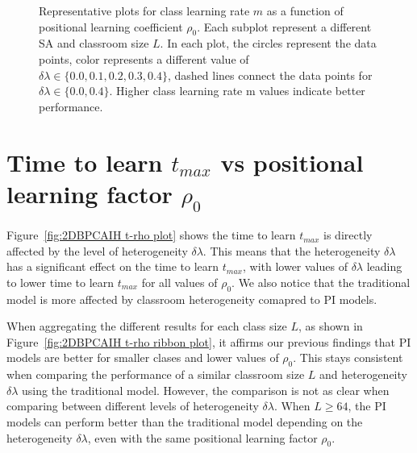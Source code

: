 \begin{figure}[htbp!]
   \caption{Representative plots for class learning rate $m$ as a function of positional learning coefficient $\rho_0$.
   Each subplot represent a different SA and classroom size $L$.
   In each plot, the circles represent the data points, color represents a different value of $\delta\lambda \in \lbrace 0.0, 0.1, 0.2, 0.3, 0.4 \rbrace$, dashed lines connect the data points for $\delta\lambda \in \lbrace 0.0, 0.4 \rbrace$.
   Higher class learning rate m values indicate better performance.
   }
   \label{fig:2DBPCAIH m rho plot}
\end{figure}

\newpage %

\section{Time to learn $t_{max}$ vs positional learning factor $\rho_0$}\label{sec:BPCAIH t vs rho}
Figure~\ref{fig:2DBPCAIH t-rho plot} shows the time to learn $t_{max}$ is directly affected by the level of heterogeneity $\delta\lambda$. 
This means that the heterogeneity $\delta\lambda$ has a significant effect on the time to learn $t_{max}$, with lower values of $\delta\lambda$ leading to lower time to learn $t_{max}$ for all values of $\rho_0$. 
We also notice that the traditional model is more affected by classroom heterogeneity comapred to PI models.

When aggregating the different results for each class size $L$, as shown in Figure~\ref{fig:2DBPCAIH t-rho ribbon plot}, it affirms our previous findings that PI models are better for smaller clases and lower values of $\rho_0$.
This stays consistent when comparing the performance of a similar classroom size $L$ and heterogeneity $\delta\lambda$ using the traditional model.
However, the comparison is not as clear when comparing between different levels of heterogeneity $\delta\lambda$.
When $L\geq64$, the PI models can perform better than the traditional model depending on the heterogeneity $\delta\lambda$, even with the same positional learning factor $\rho_0$.

